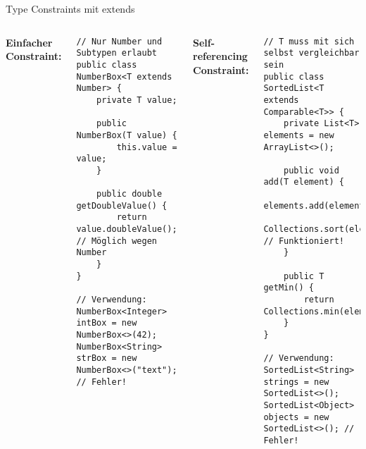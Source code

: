 \begin{frame}[fragile]{Type Constraints mit extends}
  \begin{columns}[T]
    \textbf{Einfacher Constraint:}
    \begin{lstlisting}[style=java, basicstyle=\tiny\ttfamily]
// Nur Number und Subtypen erlaubt
public class NumberBox<T extends Number> {
    private T value;

    public NumberBox(T value) {
        this.value = value;
    }

    public double getDoubleValue() {
        return value.doubleValue(); // Möglich wegen Number
    }
}

// Verwendung:
NumberBox<Integer> intBox = new NumberBox<>(42);
NumberBox<String> strBox = new NumberBox<>("text"); // Fehler!
    \end{lstlisting}

    \textbf{Self-referencing Constraint:}
    \begin{lstlisting}[style=java, basicstyle=\tiny\ttfamily]
// T muss mit sich selbst vergleichbar sein
public class SortedList<T extends Comparable<T>> {
    private List<T> elements = new ArrayList<>();

    public void add(T element) {
        elements.add(element);
        Collections.sort(elements); // Funktioniert!
    }

    public T getMin() {
        return Collections.min(elements);
    }
}

// Verwendung:
SortedList<String> strings = new SortedList<>();
SortedList<Object> objects = new SortedList<>(); // Fehler!
    \end{lstlisting}
  \end{columns}
\end{frame}

